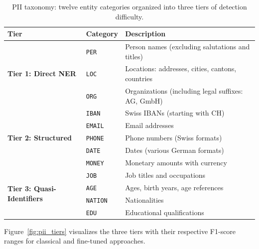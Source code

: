 \begin{table}[htbp]
\centering
\caption{PII taxonomy: twelve entity categories organized into three tiers of
detection difficulty.}
\label{tab:pii_taxonomy}
\begin{tabular}{lll}
\toprule
\textbf{Tier} & \textbf{Category} & \textbf{Description} \\
\midrule
\multirow{3}{*}{\textbf{Tier 1: Direct NER}}
  & \texttt{PER}   & Person names (excluding salutations and titles) \\
  & \texttt{LOC}   & Locations: addresses, cities, cantons, countries \\
  & \texttt{ORG}   & Organizations (including legal suffixes: AG, GmbH) \\
\midrule
\multirow{5}{*}{\textbf{Tier 2: Structured}}
  & \texttt{IBAN}  & Swiss IBANs (starting with CH) \\
  & \texttt{EMAIL} & Email addresses \\
  & \texttt{PHONE} & Phone numbers (Swiss formats) \\
  & \texttt{DATE}  & Dates (various German formats) \\
  & \texttt{MONEY} & Monetary amounts with currency \\
\midrule
\multirow{4}{*}{\textbf{Tier 3: Quasi-Identifiers}}
  & \texttt{JOB}     & Job titles and occupations \\
  & \texttt{AGE}     & Ages, birth years, age references \\
  & \texttt{NATION}  & Nationalities \\
  & \texttt{EDU}     & Educational qualifications \\
\bottomrule
\end{tabular}
\end{table}

Figure~\ref{fig:pii_tiers} visualizes the three tiers with their respective
F1-score ranges for classical and fine-tuned approaches.

